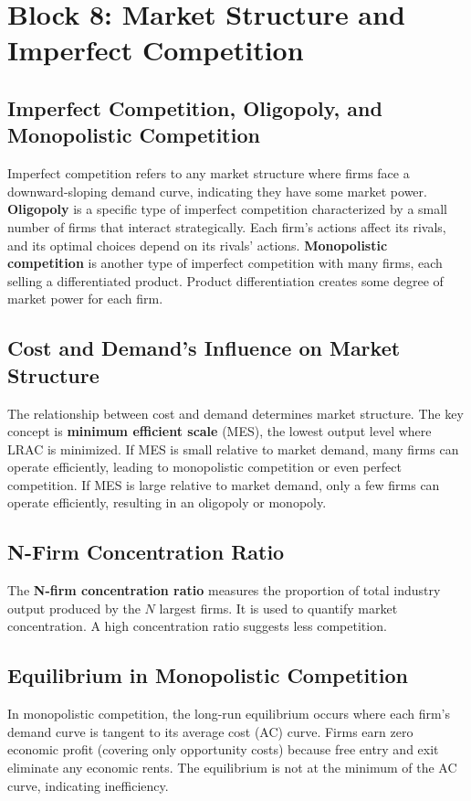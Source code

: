 \chapter*{Block 8: Market Structure and Imperfect Competition}

\section*{Imperfect Competition, Oligopoly, and Monopolistic Competition}
Imperfect competition refers to any market structure where firms face a downward-sloping demand curve, indicating they have some market power. \textbf{Oligopoly} is a specific type of imperfect competition characterized by a small number of firms that interact strategically. Each firm's actions affect its rivals, and its optimal choices depend on its rivals' actions. \textbf{Monopolistic competition} is another type of imperfect competition with many firms, each selling a differentiated product. Product differentiation creates some degree of market power for each firm.

\section*{Cost and Demand's Influence on Market Structure}
The relationship between cost and demand determines market structure. The key concept is \textbf{minimum efficient scale} (MES), the lowest output level where LRAC is minimized. If MES is small relative to market demand, many firms can operate efficiently, leading to monopolistic competition or even perfect competition. If MES is large relative to market demand, only a few firms can operate efficiently, resulting in an oligopoly or monopoly.

\section*{N-Firm Concentration Ratio}
The \textbf{N-firm concentration ratio} measures the proportion of total industry output produced by the \(N\) largest firms. It is used to quantify market concentration. A high concentration ratio suggests less competition.

\section*{Equilibrium in Monopolistic Competition}
In monopolistic competition, the long-run equilibrium occurs where each firm's demand curve is tangent to its average cost (AC) curve. Firms earn zero economic profit (covering only opportunity costs) because free entry and exit eliminate any economic rents. The equilibrium is not at the minimum of the AC curve, indicating inefficiency.

